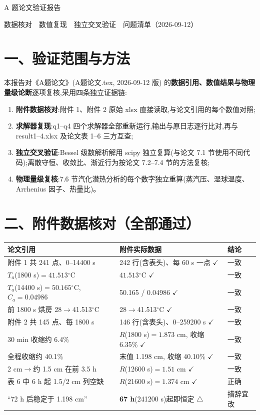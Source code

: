 \documentclass[12pt,a4paper]{ctexart}
\newcommand{\ok}{$\checkmark$}
\newcommand{\warn}{$\triangle$}
\newcommand{\dg}{\ensuremath{^\circ}}
\begin{document}
\begin{center}
{\heiti{} A 题论文验证报告\par}
\vspace{0.4em}
{ 数据核对 \,\textbullet\, 数值复现 \,\textbullet\, 独立交叉验证 \,\textbullet\, 问题清单（2026-09-12）\par}
\end{center}

\section{一、验证范围与方法}

本报告对《A题论文》(A题论文.tex, 2026-09-12 版) 的\textbf{数据引用、数值结果与物理量级论断}逐项复核,采用四条独立证据链:

\begin{enumerate}[label=(\arabic*),leftmargin=2.5em]
\item \textbf{附件数据核对}:附件 1、附件 2 原始 xlsx 直接读取,与论文引用的每个数值对照;
\item \textbf{求解器复现}:q1--q4 四个求解器全部重新运行,输出与原日志逐行比对,再与 result1--4.xlsx 及论文表 1--6 三方互查;
\item \textbf{独立交叉验证}:Bessel 级数解析解用 scipy 独立复算(与论文 7.1 节使用不同代码);离散守恒、收敛比、渐近行为按论文 7.2--7.4 节的方法复核;
\item \textbf{物理量级复核}:7.6 节汽化潜热分析的每个数字独立重算(蒸汽压、湿球温度、Arrhenius 因子、热量比)。
\end{enumerate}

\section{二、附件数据核对（全部通过）}

\begin{center}
{\begin{tabular}{lll}
\toprule
论文引用 & 附件实际数据 & 结论 \\
\midrule
附件 1 共 241 点、0--14400 s & 242 行(含表头)、每 60 s 一点 \ok & 一致 \\
$T_a$(1800 s)$=41.513\dg$C & $41.513\dg$C \ok & 一致 \\
$T_a$(14400 s)$=50.165\dg$C, $C_a=0.04986$ & 50.165 / 0.04986 \ok & 一致 \\
前 1800 s 烘房 28$\to$41.513\dg C & 28$\to$41.513\dg C \ok & 一致 \\
附件 2 共 145 点、每 1800 s & 146 行(含表头)、0--259200 s \ok & 一致 \\
30 min 收缩约 6.4\% & $R$(1800 s)$=1.873$ cm, 收缩 6.35\% \ok & 一致 \\
全程收缩约 40.1\% & 末值 1.198 cm, 收缩 40.10\% \ok & 一致 \\
2 cm$\to$约 1.5 cm 在前 3.5 h & $R$(12600 s)$=1.51$ cm \ok & 一致 \\
表 6 中 6 h 起 1.5/2 cm 列空缺 & $R$(21600 s)$=1.374$ cm \ok & 正确 \\
``72 h 后稳定于 1.198 cm'' & \textbf{67 h}(241200 s)起即恒定 \warn & 措辞宜改 \\
\bottomrule
\end{tabular}}
\end{center}
\end{document}
